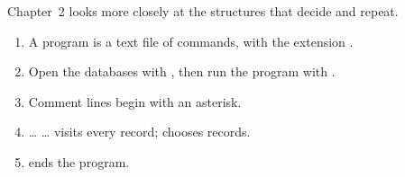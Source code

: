 Chapter~2 looks more closely at the structures that decide and repeat.

\begin{enumerate}
\item A program is a text file of commands, with the extension .
\item Open the databases with , then run the program with .
\item Comment lines begin with an asterisk.
\item {} \ldots{}  \ldots{}  visits
  every record;  chooses records.
\item {} ends the program.
\end{enumerate}
